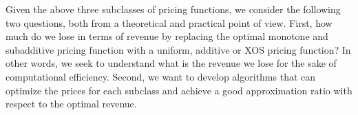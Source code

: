 Given the above three subclasses of pricing functions, we consider the following two questions, both from a theoretical and practical point of view.
First, how much do we lose in terms of revenue by replacing the optimal monotone and subadditive pricing function with a uniform, additive or XOS pricing function? In other words, we seek to understand what is the revenue we lose for the sake of computational efficiency.
Second, we want to develop algorithms that can optimize the prices for each subclass and achieve a good approximation ratio with respect to the optimal revenue.


